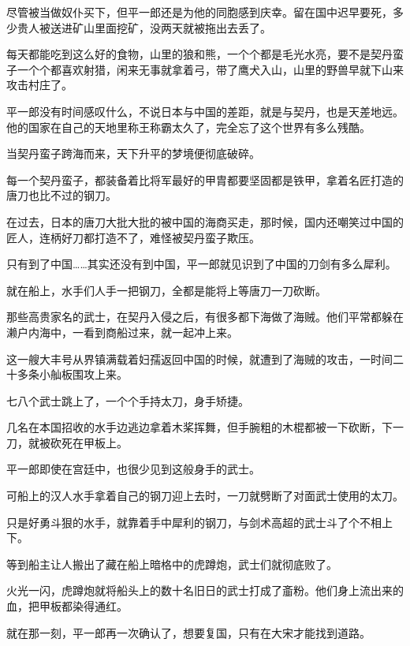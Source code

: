 尽管被当做奴仆买下，但平一郎还是为他的同胞感到庆幸。留在国中迟早要死，多少贵人被送进矿山里面挖矿，没两天就被拖出去丢了。

每天都能吃到这么好的食物，山里的狼和熊，一个个都是毛光水亮，要不是契丹蛮子一个个都喜欢射猎，闲来无事就拿着弓，带了鹰犬入山，山里的野兽早就下山来攻击村庄了。

平一郎没有时间感叹什么，不说日本与中国的差距，就是与契丹，也是天差地远。他的国家在自己的天地里称王称霸太久了，完全忘了这个世界有多么残酷。

当契丹蛮子跨海而来，天下升平的梦境便彻底破碎。

每一个契丹蛮子，都装备着比将军最好的甲胄都要坚固都是铁甲，拿着名匠打造的唐刀也比不过的钢刀。

在过去，日本的唐刀大批大批的被中国的海商买走，那时候，国内还嘲笑过中国的匠人，连柄好刀都打造不了，难怪被契丹蛮子欺压。

只有到了中国……其实还没有到中国，平一郎就见识到了中国的刀剑有多么犀利。

就在船上，水手们人手一把钢刀，全都是能将上等唐刀一刀砍断。

那些高贵家名的武士，在契丹入侵之后，有很多都下海做了海贼。他们平常都躲在濑户内海中，一看到商船过来，就一起冲上来。

这一艘大丰号从界镇满载着妇孺返回中国的时候，就遭到了海贼的攻击，一时间二十多条小舢板围攻上来。

七八个武士跳上了，一个个手持太刀，身手矫捷。

几名在本国招收的水手边逃边拿着木桨挥舞，但手腕粗的木棍都被一下砍断，下一刀，就被砍死在甲板上。

平一郎即使在宫廷中，也很少见到这般身手的武士。

可船上的汉人水手拿着自己的钢刀迎上去时，一刀就劈断了对面武士使用的太刀。

只是好勇斗狠的水手，就靠着手中犀利的钢刀，与剑术高超的武士斗了个不相上下。

等到船主让人搬出了藏在船上暗格中的虎蹲炮，武士们就彻底败了。

火光一闪，虎蹲炮就将船头上的数十名旧日的武士打成了齑粉。他们身上流出来的血，把甲板都染得通红。

就在那一刻，平一郎再一次确认了，想要复国，只有在大宋才能找到道路。
